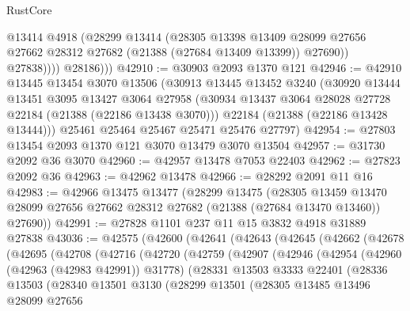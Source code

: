 \begin{lexlean}{RustCore}
\begin{coremodule}
                  @13414
                  @4918
                  (@28299
                    @13414
                    (@28305
                      @13398
                      @13409
                      @28099
                      @27656
                      @27662
                      @28312
                      @27682
                      (@21388 (@27684 @13409 @13399))
                      @27690))
                  @27838))))
          @28186)))
@42910 := @30903 @2093 @1370 @121
@42946 := @42910
    @13445
    @13454
    @3070
    @13506
    (@30913
      @13445
      @13452
      @3240
      (@30920
        @13444
        @13451
        @3095
        @13427
        @3064
        @27958
        (@30934 @13437 @3064 @28028 @27728 @22184 (@21388 (@22186 @13438 @3070)))
        @22184
        (@21388 (@22186 @13428 @13444)))
      @25461
      @25464
      @25467
      @25471
      @25476
      @27797)
@42954 := @27803 @13454 @2093 @1370 @121 @3070 @13479 @3070 @13504
@42957 := @31730 @2092 @36 @3070
@42960 := @42957 @13478 @7053 @22403
@42962 := @27823 @2092 @36
@42963 := @42962 @13478
@42966 := @28292 @2091 @11 @16
@42983 := @42966
    @13475
    @13477
    (@28299
      @13475
      (@28305
        @13459
        @13470
        @28099
        @27656
        @27662
        @28312
        @27682
        (@21388 (@27684 @13470 @13460))
        @27690))
@42991 := @27828 @1101 @237 @11 @15 @3832 @4918 @31889 @27838
@43036 := @42575
    (@42600
      (@42641
        (@42643
          (@42645
            (@42662
              (@42678
                (@42695
                  (@42708
                    (@42716
                      (@42720
                        (@42759
                          (@42907
                            (@42946
                              (@42954
                                (@42960 (@42963 (@42983 @42991)) @31778)
                                (@28331
                                  @13503
                                  @3333
                                  @22401
                                  (@28336
                                    @13503
                                    (@28340
                                      @13501
                                      @3130
                                      (@28299
                                        @13501
                                        (@28305
                                          @13485
                                          @13496
                                          @28099
                                          @27656

\end{coremodule}
\end{lexlean}
